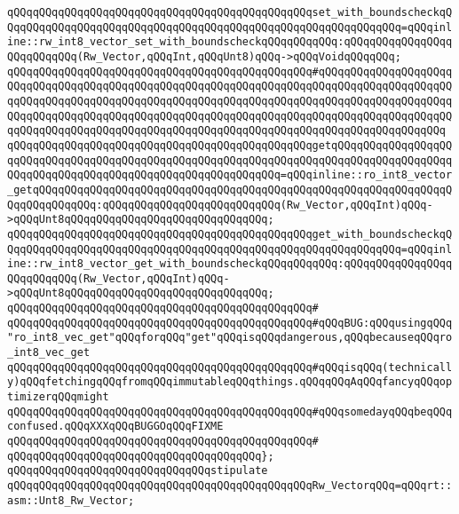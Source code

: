 \verb|qQQqqQQqqQQqqQQqqQQqqQQqqQQqqQQqqQQqqQQqqQQqqQQqset_with_boundscheckqQQqqQQqqQQqqQQqqQQqqQQqqQQqqQQqqQQqqQQqqQQqqQQqqQQqqQQqqQQqqQQq=qQQqinline::rw_int8_vector_set_with_boundscheckqQQqqQQqqQQq:qQQqqQQqqQQqqQQqqQQqqQQqqQQq(Rw_Vector,qQQqInt,qQQqUnt8)qQQq->qQQqVoidqQQqqQQq;|\newline
\verb|qQQqqQQqqQQqqQQqqQQqqQQqqQQqqQQqqQQqqQQqqQQqqQQq#qQQqqQQqqQQqqQQqqQQqqQQqqQQqqQQqqQQqqQQqqQQqqQQqqQQqqQQqqQQqqQQqqQQqqQQqqQQqqQQqqQQqqQQqqQQqqQQqqQQqqQQqqQQqqQQqqQQqqQQqqQQqqQQqqQQqqQQqqQQqqQQqqQQqqQQqqQQqqQQqqQQqqQQqqQQqqQQqqQQqqQQqqQQqqQQqqQQqqQQqqQQqqQQqqQQqqQQqqQQqqQQqqQQqqQQqqQQqqQQqqQQqqQQqqQQqqQQqqQQqqQQqqQQqqQQqqQQqqQQqqQQqqQQqqQQqqQQqqQQq|\newline
\verb|qQQqqQQqqQQqqQQqqQQqqQQqqQQqqQQqqQQqqQQqqQQqqQQqgetqQQqqQQqqQQqqQQqqQQqqQQqqQQqqQQqqQQqqQQqqQQqqQQqqQQqqQQqqQQqqQQqqQQqqQQqqQQqqQQqqQQqqQQqqQQqqQQqqQQqqQQqqQQqqQQqqQQqqQQqqQQqqQQqqQQq=qQQqinline::ro_int8_vector_getqQQqqQQqqQQqqQQqqQQqqQQqqQQqqQQqqQQqqQQqqQQqqQQqqQQqqQQqqQQqqQQqqQQqqQQqqQQqqQQq:qQQqqQQqqQQqqQQqqQQqqQQqqQQq(Rw_Vector,qQQqInt)qQQq->qQQqUnt8qQQqqQQqqQQqqQQqqQQqqQQqqQQqqQQq;|\newline
\verb|qQQqqQQqqQQqqQQqqQQqqQQqqQQqqQQqqQQqqQQqqQQqqQQqget_with_boundscheckqQQqqQQqqQQqqQQqqQQqqQQqqQQqqQQqqQQqqQQqqQQqqQQqqQQqqQQqqQQqqQQq=qQQqinline::rw_int8_vector_get_with_boundscheckqQQqqQQqqQQq:qQQqqQQqqQQqqQQqqQQqqQQqqQQq(Rw_Vector,qQQqInt)qQQq->qQQqUnt8qQQqqQQqqQQqqQQqqQQqqQQqqQQqqQQq;|\newline
\verb|qQQqqQQqqQQqqQQqqQQqqQQqqQQqqQQqqQQqqQQqqQQqqQQq#|\newline
\verb|qQQqqQQqqQQqqQQqqQQqqQQqqQQqqQQqqQQqqQQqqQQqqQQq#qQQqBUG:qQQqusingqQQq"ro_int8_vec_get"qQQqforqQQq"get"qQQqisqQQqdangerous,qQQqbecauseqQQqro_int8_vec_get|\newline
\verb|qQQqqQQqqQQqqQQqqQQqqQQqqQQqqQQqqQQqqQQqqQQqqQQq#qQQqisqQQq(technically)qQQqfetchingqQQqfromqQQqimmutableqQQqthings.qQQqqQQqAqQQqfancyqQQqoptimizerqQQqmight|\newline
\verb|qQQqqQQqqQQqqQQqqQQqqQQqqQQqqQQqqQQqqQQqqQQqqQQq#qQQqsomedayqQQqbeqQQqconfused.qQQqXXXqQQqBUGGOqQQqFIXME|\newline
\verb|qQQqqQQqqQQqqQQqqQQqqQQqqQQqqQQqqQQqqQQqqQQqqQQq#|\newline
\verb|qQQqqQQqqQQqqQQqqQQqqQQqqQQqqQQqqQQqqQQq};|\newline
\newline
\verb|qQQqqQQqqQQqqQQqqQQqqQQqqQQqqQQqstipulate|\newline
\verb|qQQqqQQqqQQqqQQqqQQqqQQqqQQqqQQqqQQqqQQqqQQqqQQqRw_VectorqQQq=qQQqrt::asm::Unt8_Rw_Vector;|\newline
